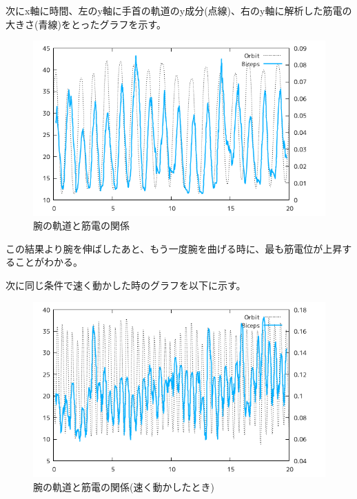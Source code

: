 \documentclass{jsarticle}
\begin{document}
次にx軸に時間、左のy軸に手首の軌道のy成分(点線)、右のy軸に解析した筋電の大きさ(青線)をとったグラフを示す。
\begin{figure}[h]
  \begin{center}
    \includegraphics[clip,width=150mm]{Graph_4.png}
    \caption{腕の軌道と筋電の関係}
  \end{center}
\end{figure}

この結果より腕を伸ばしたあと、もう一度腕を曲げる時に、最も筋電位が上昇することがわかる。

次に同じ条件で速く動かした時のグラフを以下に示す。
\begin{figure}[h]
  \begin{center}
    \includegraphics[clip,width=150mm]{Graph_5.png}
    \caption{腕の軌道と筋電の関係(速く動かしたとき)}
  \end{center}
\end{figure}
\end{document}
